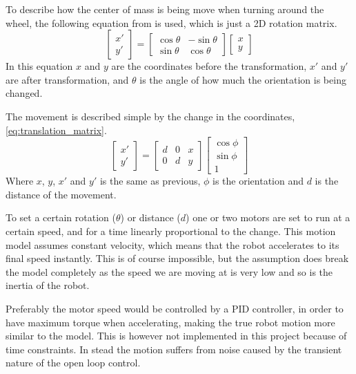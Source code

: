 \documentclass[Main]{subfiles}
\begin{document}
		To describe how the center of mass is being move when turning around the wheel, the following equation from \cite{Wikipedia2015} is used, which is just a 2D rotation matrix.
		\begin{equation}
		\begin{bmatrix} x' \\ y' \end{bmatrix} = \begin{bmatrix} \cos{\theta} & -\sin{\theta} \\ \sin{\theta} & \cos{\theta} \end{bmatrix} \begin{bmatrix} x \\ y \end{bmatrix}
		\end{equation}
		In this equation $x$ and $y$ are the coordinates before the transformation, $x'$ and $y'$ are after transformation, and $\theta$ is the angle of how much the orientation is being changed.

		The movement is described simple by the change in the coordinates, \autoref{eq:translation_matrix}.
		\begin{equation}
		\label{eq:translation_matrix}
		\begin{bmatrix} x' \\ y' \end{bmatrix} = \begin{bmatrix}  d & 0 & x \\ 0 & d & y \end{bmatrix} \begin{bmatrix} \cos{\phi} \\ \sin{\phi} \\ 1 \end{bmatrix} 		
		\end{equation}
		Where $x$, $y$, $x'$ and $y'$ is the same as previous, $\phi$ is the orientation and $d$ is the distance of the movement.
		
		To set a certain rotation ($\theta$) or distance ($d$) one or two motors are set to run at a certain speed, and for a time linearly proportional to the change.
		This motion model assumes constant velocity, which means that the robot accelerates to its final speed instantly.
		This is of course impossible, but the assumption does break the model completely as the speed we are moving at is very low and so is the inertia of the robot.
		
		Preferably the motor speed would be controlled by a PID controller, in order to have maximum torque when accelerating, making the true robot motion more similar to the model.
		This is however not implemented in this project because of time constraints.
		In stead the motion suffers from noise caused by the transient nature of the open loop control.
\end{document}
